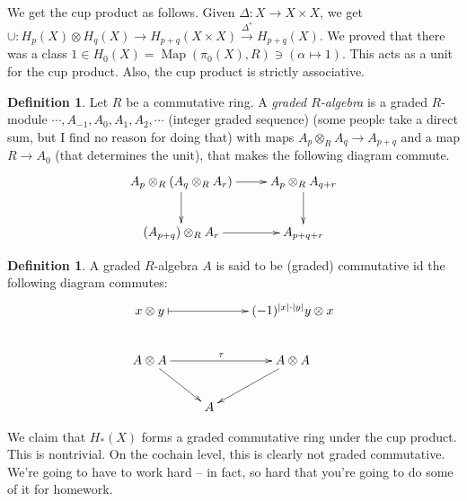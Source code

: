 \documentclass{amsart}
\theoremstyle{theorem}
\theoremstyle{definition}
\newtheorem{definition}[theorem]{Definition}
\DeclareMathOperator{\Map}{Map}
\begin{document}
We get the cup product as follows. Given $\Delta:X\to X\times X$, we get $\cup: H_p(X)\otimes H_q(X)\to H_{p+q}(X\times X)\xrightarrow{\Delta^\ast} H_{p+q}(X)$. We proved that there was a class $1\in H_0(X)=\Map(\pi_0(X),R)\ni (\alpha\mapsto 1)$. This acts as a unit for the cup product. Also, the cup product is strictly associative.
\begin{definition}
Let $R$ be a commutative ring. A \emph{graded $R$-algebra} is a graded $R$-module $\cdots,A_{-1},A_0, A_1,A_2,\cdots$ (integer graded sequence) (some people take a direct sum, but I find no reason for doing that) with maps $A_p\otimes_R A_q\to A_{p+q}$ and a map $R\to A_0$ (that determines the unit), that makes the following diagram commute.
\begin{equation*}
\xymatrix{
	A_p\otimes_R (A_q\otimes_R A_r)\ar[r]\ar[d] & A_p\otimes_R A_{q+r}\ar[d]\\
	(A_{p+q})\otimes_R A_r \ar[r] & A_{p+q+r}
}
\end{equation*}
\end{definition}
\begin{definition}
A graded $R$-algebra $A$ is said to be (graded) commutative id the following diagram commutes:
\begin{equation*}
\xymatrix{
	x\otimes y\ar@{|->}[rr] & & (-1)^{|x|\cdot|y|}y\otimes x\\
	A\otimes A\ar[rr]^{\tau}\ar[dr] & & A\otimes A\ar[dl]\\
	 & A & 
}
\end{equation*}
\end{definition}
We claim that $ H_\ast(X)$ forms a graded commutative ring under the cup product. This is nontrivial. On the cochain level, this is clearly not graded commutative. We're going to have to work hard -- in fact, so hard that you're going to do some of it for homework.
\end{document}
